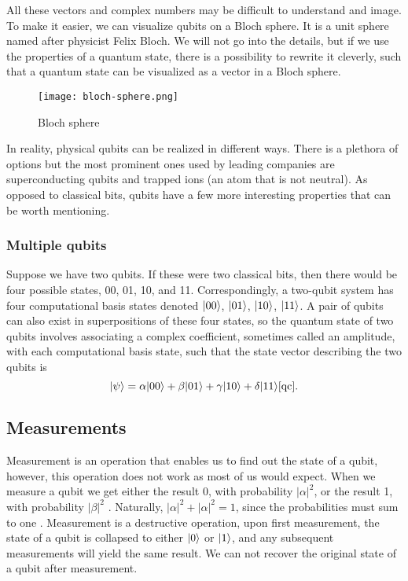 All these vectors and complex numbers may be difficult to understand and image. To make it easier, we can visualize qubits on a Bloch sphere. It is a unit sphere named after physicist Felix Bloch. We will not go into the details, but if we use the properties of a quantum state, there is a possibility to rewrite it cleverly, such that a quantum state can be visualized as a vector in a Bloch sphere.

\begin{figure}[H]
    \begin{center}
       \texttt{[image: bloch-sphere.png]}
       \caption{Bloch sphere \cite{bloch_sphere}}
    \end{center}
\end{figure} 


In reality, physical qubits can be realized in different ways. There is a plethora of options but the most prominent ones used by leading companies are superconducting qubits and trapped ions (an atom that is not neutral).
As opposed to classical bits, qubits have a few more interesting properties that can be worth mentioning.

\subsubsection{Multiple qubits}
Suppose we have two qubits. If these were two classical bits, then there would be four possible states, 00, 01, 10, and 11. Correspondingly, a two-qubit system has four computational basis states denoted $\lvert00\rangle$, $\lvert01\rangle$, $\lvert10\rangle$, $\lvert11\rangle$. A pair of qubits can also exist in superpositions of these four states, so the quantum state of two qubits involves associating a complex coefficient, sometimes called an amplitude, with each computational basis state, such that the state vector describing the two qubits is
$$\lvert\psi\rangle = \alpha \lvert00\rangle + \beta \lvert01\rangle + \gamma \lvert10\rangle + \delta \lvert11\rangle\cite{qc}\text{.}$$

\subsection{Measurements}
Measurement is an operation that enables us to find out the state of a qubit, however, this operation does not work as most of us would expect. When we measure a qubit we get either the result 0, with probability $\lvert \alpha \rvert^2$, or the result 1, with probability $\lvert \beta \rvert^2$ \cite{qc}. Naturally, $\lvert \alpha \rvert^2 + \lvert \alpha \rvert^2 = 1$, since the probabilities must sum to one \cite{qc}. Measurement is a destructive operation, upon first measurement, the state of a qubit is collapsed to either $\lvert0\rangle$ or $\lvert1\rangle$, and any subsequent measurements will yield the same result. We can not recover the original state of a qubit after measurement.

